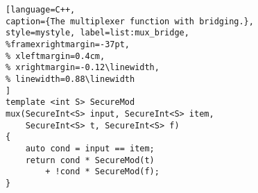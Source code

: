 \begin{figure}[t]
\begin{minipage}{\linewidth}
\begin{lstlisting}[language=C++,
caption={The multiplexer function with bridging.},
style=mystyle, label=list:mux_bridge,
%framexrightmargin=-37pt,
% xleftmargin=0.4cm,
% xrightmargin=-0.12\linewidth,
% linewidth=0.88\linewidth
]
template <int S> SecureMod
mux(SecureInt<S> input, SecureInt<S> item,
    SecureInt<S> t, SecureInt<S> f)
{
    auto cond = input == item;
    return cond * SecureMod(t)
        + !cond * SecureMod(f);
}
\end{lstlisting}
\end{minipage}
\end{figure}
